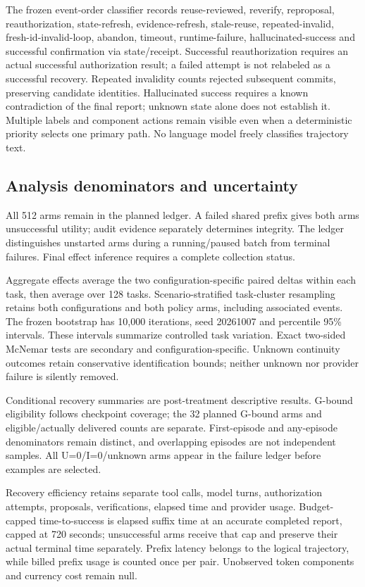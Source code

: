 \documentclass[11pt,a4paper]{article}
\begin{document}
The frozen event-order classifier records reuse-reviewed, reverify, reproposal, reauthorization, state-refresh, evidence-refresh, stale-reuse, repeated-invalid, fresh-id-invalid-loop, abandon, timeout, runtime-failure, hallucinated-success and successful confirmation via state/receipt. Successful reauthorization requires an actual successful authorization result; a failed attempt is not relabeled as a successful recovery. Repeated invalidity counts rejected subsequent commits, preserving candidate identities. Hallucinated success requires a known contradiction of the final report; unknown state alone does not establish it. Multiple labels and component actions remain visible even when a deterministic priority selects one primary path. No language model freely classifies trajectory text.

\subsection{Analysis denominators and uncertainty}
All 512 arms remain in the planned ledger. A failed shared prefix gives both arms unsuccessful utility; audit evidence separately determines integrity. The ledger distinguishes unstarted arms during a running/paused batch from terminal failures. Final effect inference requires a complete collection status.

Aggregate effects average the two configuration-specific paired deltas within each task, then average over 128 tasks. Scenario-stratified task-cluster resampling retains both configurations and both policy arms, including associated events. The frozen bootstrap has 10,000 iterations, seed 20261007 and percentile 95\% intervals. These intervals summarize controlled task variation. Exact two-sided McNemar tests are secondary and configuration-specific. Unknown continuity outcomes retain conservative identification bounds; neither unknown nor provider failure is silently removed.

Conditional recovery summaries are post-treatment descriptive results. G-bound eligibility follows checkpoint coverage; the 32 planned G-bound arms and eligible/actually delivered counts are separate. First-episode and any-episode denominators remain distinct, and overlapping episodes are not independent samples. All U=0/I=0/unknown arms appear in the failure ledger before examples are selected.

Recovery efficiency retains separate tool calls, model turns, authorization attempts, proposals, verifications, elapsed time and provider usage. Budget-capped time-to-success is elapsed suffix time at an accurate completed report, capped at 720 seconds; unsuccessful arms receive that cap and preserve their actual terminal time separately. Prefix latency belongs to the logical trajectory, while billed prefix usage is counted once per pair. Unobserved token components and currency cost remain null.
\end{document}
